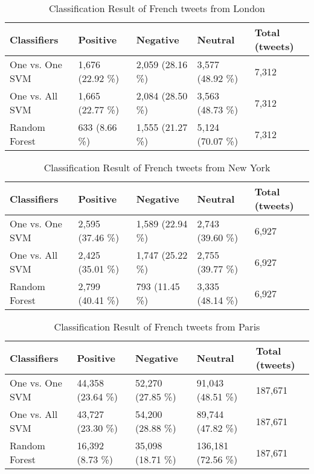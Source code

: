 \begin{table}[ht]
	\caption{Classification Result of French tweets from London}
	\begin{tabular}{|l|p{1.8cm}|p{1.8cm}|p{1.8cm}|p{1.8cm}|} \hline
	Classifiers & Positive & Negative & Neutral & Total (tweets)\\ \hline
	
One vs. One SVM & 1,676 (22.92 \%)& 2,059 (28.16 \%)& 3,577 (48.92 \%)& 7,312  \\ \hline
One vs. All SVM & 1,665 (22.77 \%)& 2,084 (28.50 \%)& 3,563 (48.73 \%)& 7,312  \\ \hline
Random Forest   & 633  \newline(8.66 \%)& 1,555 (21.27 \%)& 5,124 (70.07 \%)& 7,312  \\ \hline

	\end{tabular}
	\label{tab:result_london_fr}
\end{table}


\begin{table}[ht]
	\caption{Classification Result of French tweets from New York}
	\begin{tabular}{|l|p{1.8cm}|p{1.8cm}|p{1.8cm}|p{1.8cm}|} \hline
	Classifiers & Positive & Negative & Neutral & Total (tweets)\\ \hline
One vs. One SVM & 2,595 (37.46 \%)& 1,589 (22.94 \%)& 2,743 (39.60 \%)& 6,927 \\ \hline
One vs. All SVM & 2,425 (35.01 \%)& 1,747 (25.22 \%)& 2,755 (39.77 \%)& 6,927 \\ \hline
Random Forest   & 2,799 (40.41 \%)& 793  \newline(11.45 \%)& 3,335 (48.14 \%)& 6,927 \\ \hline

	\end{tabular}
	\label{tab:result_ny_fr}
\end{table}



\begin{table}[ht]
	\caption{Classification Result of French tweets from Paris}
	\begin{tabular}{|l|p{1.8cm}|p{1.8cm}|p{1.8cm}|p{1.8cm}|} \hline
	Classifiers & Positive & Negative & Neutral & Total (tweets)\\ \hline
One vs. One SVM & 44,358 (23.64 \%)& 52,270 (27.85 \%)& 91,043 (48.51 \%) & 187,671 \\ \hline
One vs. All SVM & 43,727 (23.30 \%)& 54,200 (28.88 \%)& 89,744 (47.82 \%) & 187,671 \\ \hline
Random Forest   & 16,392 (8.73 \%)& 35,098 (18.71 \%)& 136,181 (72.56 \%)& 187,671 \\ \hline
	\end{tabular}
	\label{tab:result_paris_fr}
\end{table}

